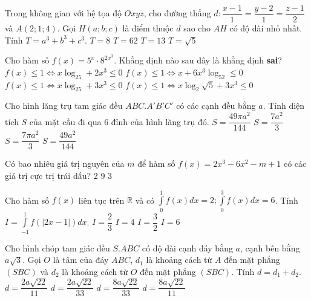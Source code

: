 \begin{ex}%
Trong không gian với hệ tọa độ $Oxyz$, cho đường thẳng $ d: \dfrac{x-1}{1}=\dfrac{y-2}{1}=\dfrac{z-1}{2}$ và $A(2; 1; 4)$. Gọi $H(a; b; c)$ là điểm thuộc $ d $ sao cho $ AH $ có độ dài nhỏ nhất. Tính $ T=a^3+b^3+c^3 $.
\choice
{$ T=8 $}
{\True $ T=62 $}
{$ T=13 $}
{$ T=\sqrt{5}$}

\end{ex}

\begin{ex}%
Cho hàm số $ f(x)=5^x \cdot 8^{2x^3}$. Khẳng định nào sau đây là khẳng định \textbf{sai}? 
\choice
{\True $ f(x)\le 1\Leftrightarrow x\log_25+2x^3\le 0 $}
{$ f(x)\le 1\Leftrightarrow x+6x^3\log_52\le 0 $}
{$ f(x)\le 1\Leftrightarrow x\log_25+3x^3\le 0 $}
{$ f(x)\le 1\Leftrightarrow x\log_2\sqrt{5}+3x^3\le 0 $}
\end{ex}

\begin{ex}%
Cho hình lăng trụ tam giác đều $ABC.A'B'C'$ có các cạnh đều bằng $ a $. Tính diện tích $ S $ của mặt cầu đi qua $6$ đỉnh của hình lăng trụ đó. 
\choice
{$ S=\dfrac{49\pi a^2}{144}$}
{$ S=\dfrac{7a^2}{3}$}
{\True $ S=\dfrac{7\pi a^2}{3}$}
{$ S=\dfrac{49a^2}{144}$}
\end{ex}

\begin{ex}%
Có bao nhiêu giá trị nguyên của $ m $ để hàm số $ f(x)=2x^3-6x^2-m+1 $ có các giá trị cực trị trái dấu? 
\choice
{2}
{9}
{3}
{}
\end{ex}

\begin{ex}%
Cho hàm số $ f(x)$ liên tục trên $ \mathbb{R}$ và có $ \int\limits_0^1f(x)dx=2; \int\limits_0^3f(x)dx=6 $. Tính $ I=\int\limits_{-1}^1f(\left| 2x-1 \right|)dx$.
\choice
{$ I=\dfrac{2}{3}$}
{\True $ I=4 $}
{$ I=\dfrac{3}{2}$}
{$ I=6 $}

\end{ex}

\begin{ex}%
Cho hình chóp tam giác đều $ S. ABC $ có độ dài cạnh đáy bằng $ a $, cạnh bên bằng $a\sqrt{3}$. Gọi $ O $ là tâm của đáy $ ABC$, $ d_1 $ là khoảng cách từ $ A $ đến mặt phẳng $(SBC)$ và $ d_2 $ là khoảng cách từ $ O $ đến mặt phẳng $(SBC)$. Tính $ d=d_1+d_2 $.
\choice
{$ d=\dfrac{2a\sqrt{22}}{11}$}
{$ d=\dfrac{2a\sqrt{22}}{33}$}
{\True $ d=\dfrac{8a\sqrt{22}}{33}$}
{$ d=\dfrac{8a\sqrt{22}}{11}$}
\end{ex}

